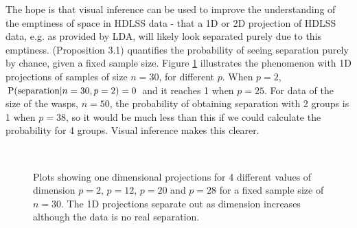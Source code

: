 The hope is that visual inference can be used to improve the understanding of the emptiness of space in HDLSS data - that a 1D or 2D projection of HDLSS data, e.g. as provided by LDA, will likely look separated purely due to this emptiness. \cite{ripley:1996} (Proposition 3.1) quantifies the probability of seeing separation purely by chance, given a fixed sample size. Figure \ref{dist_1d} illustrates the phenomenon with 1D projections of samples of size $n = 30$, for different $p$. When $p = 2$, $\hbox{P(separation}|n = 30, p = 2) = 0$ and it reaches 1 when $p = 25$. For data of the size of the wasps, $n = 50$, the probability of obtaining separation with 2 groups is 1 when $p = 38$, so it would be much less than this if we could calculate the probability for 4 groups. Visual inference makes this clearer.


\begin{figure}[htbp]
\centering
\mbox{\quad
{}\quad
{}\quad
{}}
\caption{Plots showing one dimensional projections for 4 different values of dimension $p=2$, $p=12$, $p=20$ and $p=28$ for a fixed sample size of $n = 30$. The 1D projections separate out as dimension increases although the data is no real separation.  } 
\label{dist_1d}
\end{figure}


